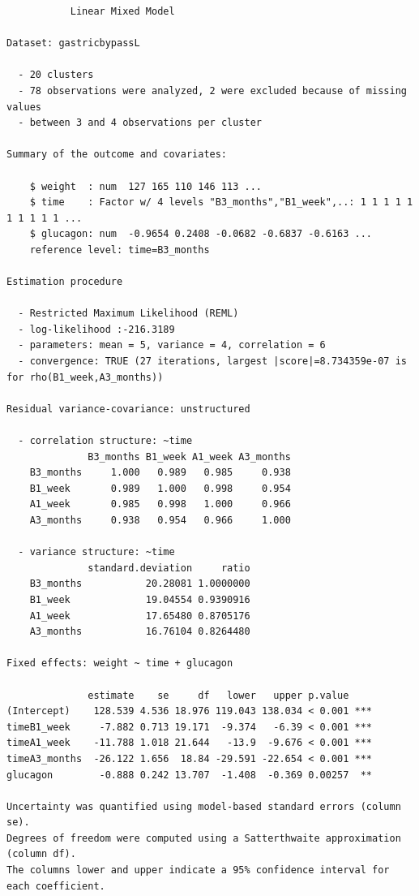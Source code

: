 \documentclass[12pt]{article}
\begin{document}
\begin{verbatim}
           Linear Mixed Model 
 
Dataset: gastricbypassL 

  - 20 clusters 
  - 78 observations were analyzed, 2 were excluded because of missing values 
  - between 3 and 4 observations per cluster 

Summary of the outcome and covariates: 

    $ weight  : num  127 165 110 146 113 ...
    $ time    : Factor w/ 4 levels "B3_months","B1_week",..: 1 1 1 1 1 1 1 1 1 1 ...
    $ glucagon: num  -0.9654 0.2408 -0.0682 -0.6837 -0.6163 ...
    reference level: time=B3_months 

Estimation procedure 

  - Restricted Maximum Likelihood (REML) 
  - log-likelihood :-216.3189
  - parameters: mean = 5, variance = 4, correlation = 6
  - convergence: TRUE (27 iterations, largest |score|=8.734359e-07 is for rho(B1_week,A3_months))
 
Residual variance-covariance: unstructured 

  - correlation structure: ~time 
              B3_months B1_week A1_week A3_months
    B3_months     1.000   0.989   0.985     0.938
    B1_week       0.989   1.000   0.998     0.954
    A1_week       0.985   0.998   1.000     0.966
    A3_months     0.938   0.954   0.966     1.000

  - variance structure: ~time 
              standard.deviation     ratio
    B3_months           20.28081 1.0000000
    B1_week             19.04554 0.9390916
    A1_week             17.65480 0.8705176
    A3_months           16.76104 0.8264480

Fixed effects: weight ~ time + glucagon 

              estimate    se     df   lower   upper p.value    
(Intercept)    128.539 4.536 18.976 119.043 138.034 < 0.001 ***
timeB1_week     -7.882 0.713 19.171  -9.374   -6.39 < 0.001 ***
timeA1_week    -11.788 1.018 21.644   -13.9  -9.676 < 0.001 ***
timeA3_months  -26.122 1.656  18.84 -29.591 -22.654 < 0.001 ***
glucagon        -0.888 0.242 13.707  -1.408  -0.369 0.00257  **

Uncertainty was quantified using model-based standard errors (column se). 
Degrees of freedom were computed using a Satterthwaite approximation (column df). 
The columns lower and upper indicate a 95% confidence interval for each coefficient.
\end{verbatim}
\end{document}
